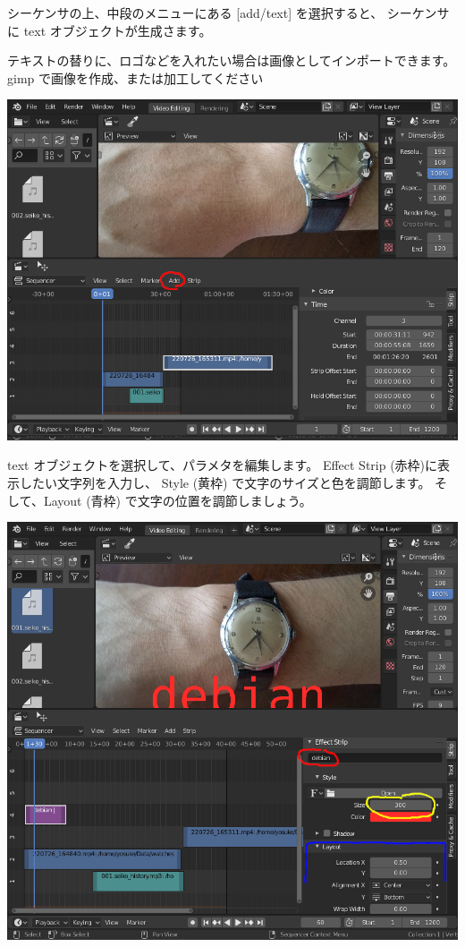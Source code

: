 \documentclass[mingoth,a4paper]{jsarticle}
\begin{document}
シーケンサの上、中段のメニューにある [add/text] を選択すると、
シーケンサに text オブジェクトが生成さます。

テキストの替りに、ロゴなどを入れたい場合は画像としてインポートできます。
gimp で画像を作成、または加工してください

\begin{center}
\includegraphics[scale=0.3]{image202209/blender_add_text.png }
\end{center}

text オブジェクトを選択して、パラメタを編集します。
Effect Strip (赤枠)に表示したい文字列を入力し、
Style (黄枠) で文字のサイズと色を調節します。
そして、Layout (青枠) で文字の位置を調節しましょう。

\begin{center}
\includegraphics[scale=0.3]{image202209/blender_text_params.png }
\end{center}
\end{document}
